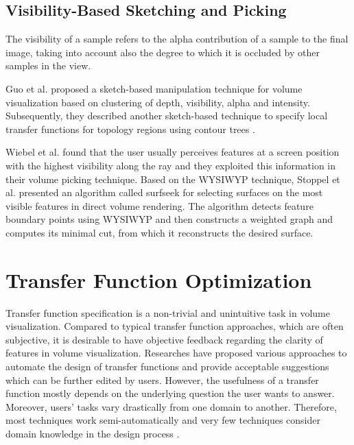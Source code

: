 \documentclass{egpubl}
\begin{document}
\subsection{Visibility-Based Sketching and Picking}

The visibility of a sample refers to the alpha contribution of a sample to the final image, taking into account also the degree to which it is occluded by other samples in the view.

Guo et al. \cite{guo_wysiwyg_2011} proposed a sketch-based manipulation technique for volume visualization based on clustering of depth, visibility, alpha and intensity. Subsequently, they described another sketch-based technique to specify local transfer functions for topology regions using contour trees \cite{guo_local_2013}. 

Wiebel et al. \cite{wiebel_wysiwyp:_2012} found that the user usually perceives features at a screen position with the highest visibility along the ray and they exploited this information in their volume picking technique.
Based on the WYSIWYP technique, Stoppel et al. \cite{elmqvist_visibility-driven_2014} presented an algorithm called surfseek for selecting surfaces on the most visible features in direct volume rendering. The algorithm detects feature boundary points using WYSIWYP and then constructs a weighted graph and computes its minimal cut, from which it reconstructs the desired surface.

\section{Transfer Function Optimization}
Transfer function specification is a non-trivial and unintuitive task in volume visualization. Compared to typical transfer function approaches, which are often subjective, it is desirable to have objective feedback regarding the clarity of features in volume visualization.
Researches have proposed various approaches to automate the design of transfer functions and provide acceptable suggestions which can be further edited by users. However, the usefulness of a transfer function mostly depends on the underlying question the user wants to answer. Moreover, users' tasks vary drastically from one domain to another. Therefore, most techniques work semi-automatically and very few techniques consider domain knowledge in the design process \cite{zudilova-seinstra_trends_2008}.
\end{document}
